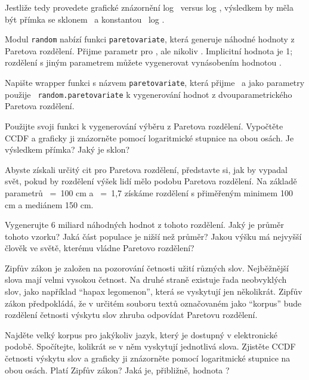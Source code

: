 \documentclass[12pt]{book}
\begin{document}

Jestliže tedy provedete grafické znázornění log \y~versus log \x, výsledkem by měla být přímka se sklonem \minus\myalpha~a konstantou \myalpha~log \x{}.

\begin{exercise}
Modul {\tt random} nabízí funkci {\tt paretovariate},
která generuje náhodné hodnoty z Paretova rozdělení.  Přijme parametr pro
\myalpha, ale nikoliv \x{}. Implicitní hodnota
\x{} je 1; rozdělení s jiným parametrem můžete vygenerovat vynásobením hodnotou \x{}.

Napište wrapper funkci s názvem {\tt paretovariate}, která přijme
\myalpha~a \x {} jako parametry použije {\tt
  random.paretovariate} k vygenerování hodnot z dvouparametrického Paretova rozdělení.

Použijte svoji funkci k vygenerování výběru z Paretova rozdělení. Vypočtěte
CCDF a graficky ji znázorněte pomocí logaritmické stupnice na obou osách. Je výsledkem přímka? Jaký je sklon?

\end{exercise}

\begin{exercise}
Abyste získali určitý cit pro Paretova rozdělení, představte si, jak by vypadal svět, pokud by rozdělení výšek lidí mělo podobu Paretova rozdělení. Na základě parametrů \x {}~=~100 cm a \myalpha~=~1,7 získáme rozdělení s přiměřeným minimem 100 cm a mediánem 150 cm.

Vygenerujte 6 miliard náhodných hodnot z tohoto rozdělení. Jaký je průměr tohoto vzorku?  Jaká část populace je nižší než průměr? Jakou výšku má nejvyšší člověk ve světě, kterému vládne Paretovo rozdělení?

\end{exercise}

\begin{exercise}
Zipfův zákon je založen na pozorování četnosti užití různých slov. Nejběžnější slova mají velmi vysokou četnost. Na druhé straně existuje řada neobvyklých slov, jako například ``hapax legomenon'', která se vyskytují jen několikrát. Zipfův zákon předpokládá, že v určitém souboru textů označovaném jako ``korpus'' bude rozdělení četnosti výskytu slov zhruba odpovídat Paretovu rozdělení.

Najděte velký korpus pro jakýkoliv jazyk, který je dostupný v elektronické podobě. Spočítejte, kolikrát se v něm vyskytují jednotlivá slova. Zjistěte CCDF četnosti výskytu slov a graficky ji znázorněte pomocí logaritmické stupnice na obou osách. Platí Zipfův zákon? Jaká je, přibližně, hodnota \myalpha?

\end{exercise}
\end{document}
